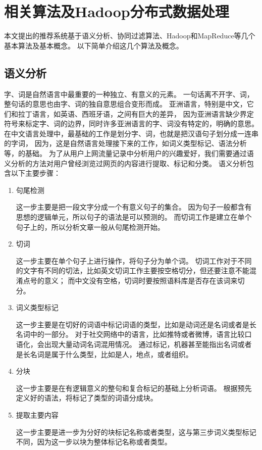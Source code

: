 \chapter{相关算法及Hadoop分布式数据处理}
本文提出的推荐系统基于语义分析、协同过滤算法、Hadoop和MapReduce等几个基本算法及基本概念。
以下简单介绍这几个算法及概念。

\section{语义分析}
字、词是自然语言中最重要的一种独立、有意义的元素。
一句话离不开字、词，整句话的意思也由字、词的独自意思组合变形而成。
亚洲语言，特别是中文，它们和拉丁语言，如英语、西班牙语，之间有巨大的差异，
因为亚洲语言缺少界定符号来标定字、词的边界，同时许多亚洲语言的字、词没有特定的，明确的意思。
在中文语言处理中，最基础的工作是划分字、词，也就是把汉语句子划分成一连串的字词，
因为，这是自然语言处理接下来的工作，如词义类型标记、语法分析等，的基础。
为了从用户上网流量记录中分析用户的兴趣爱好，我们需要通过语义分析的方法对用户曾经浏览过网页的内容进行提取、标记和分类。
语义分析包含以下主要步骤：
\begin{enumerate}
	\item 句尾检测

	这一步主要是把一段文字分成一个有意义句子的集合\parencite{kiss2006unsupervised}。
	因为句子一般都含有思想的逻辑单元，所以句子的语法是可以预测的。
	而切词工作是建立在单个句子上的，所以分析文章一般从句尾检测开始。
	
	\item 切词
	
	这一步主要在单个句子上进行操作，将句子分为单个词。
	切词工作对于不同的文字有不同的切法，比如英文切词工作主要按空格切分，但还要注意不能混淆点号的意义；
	而中文没有空格，切词时要按照语料库是否存在该词来切分。

	\item 词义类型标记

	这一步主要是在切好的词语中标记词语的类型，比如是动词还是名词或者是长名词中的一部分。
	对于社交网络中的语言，比如推特或者微博，语言比较口语化，会出现大量动词名词混用情况\parencite{Gimpel2011Part,Owoputi2015Improved,Derczynski2013Twitter}。
	通过标记，机器甚至能指出名词或者是长名词是属于什么类型，比如是人，地点，或者组织。
	
	\item 分块
	
	这一步主要是在有逻辑意义的整句和复合标记的基础上分析词语。
	根据预先定义好的语法，将标记了类型的词语分成块。

	\item 提取主要内容

	这一步主要是进一步为分好的块标记名称或者类型，这与第三步词义类型标记不同，因为这一步以块为整体标记名称或者类型。
\end{enumerate}

